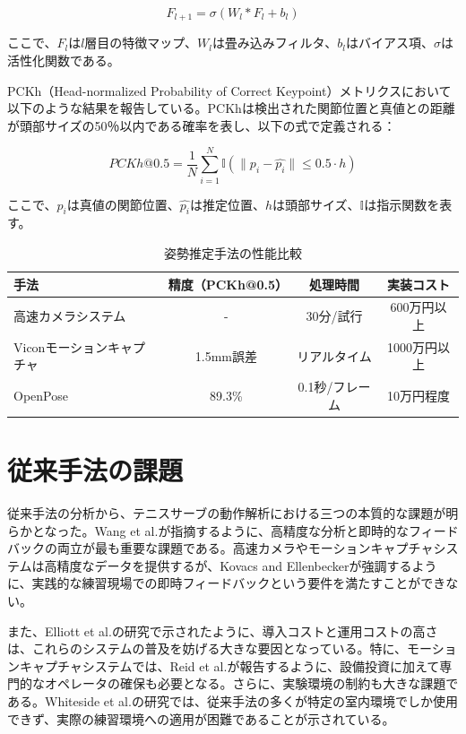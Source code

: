 \documentclass[oneside]{suribt}[11pt]
\begin{document}
\begin{equation}
F_{l+1} = \sigma(W_l * F_l + b_l)
\end{equation}

ここで、$F_l$は$l$層目の特徴マップ、$W_l$は畳み込みフィルタ、$b_l$はバイアス項、$\sigma$は活性化関数である。

PCKh（Head-normalized Probability of Correct Keypoint）メトリクスにおいて以下のような結果を報告している。PCKhは検出された関節位置と真値との距離が頭部サイズの50％以内である確率を表し、以下の式で定義される：

\begin{equation}
PCKh@0.5 = \frac{1}{N}\sum_{i=1}^{N} \mathbb{I}(\|p_i - \hat{p_i}\| \leq 0.5 \cdot h)
\end{equation}

ここで、$p_i$は真値の関節位置、$\hat{p_i}$は推定位置、$h$は頭部サイズ、$\mathbb{I}$は指示関数を表す。

\begin{table}[htbp]
\caption{姿勢推定手法の性能比較\cite{openpose,reid2007,abrams2018}}
\label{tab:comparison}
\centering
\begin{tabular}{lccc}
\hline
手法 & 精度（PCKh@0.5） & 処理時間 & 実装コスト \\
\hline
高速カメラシステム & - & 30分/試行 & 600万円以上 \\
Viconモーションキャプチャ & 1.5mm誤差 & リアルタイム & 1000万円以上 \\
OpenPose & 89.3\% & 0.1秒/フレーム & 10万円程度 \\
\hline
\end{tabular}
\end{table}

\section{従来手法の課題}
従来手法の分析から、テニスサーブの動作解析における三つの本質的な課題が明らかとなった。Wang et al.\cite{wang2019}が指摘するように、高精度な分析と即時的なフィードバックの両立が最も重要な課題である。高速カメラやモーションキャプチャシステムは高精度なデータを提供するが、Kovacs and Ellenbecker\cite{kovacs2011}が強調するように、実践的な練習現場での即時フィードバックという要件を満たすことができない。

また、Elliott et al.\cite{elliott2003}の研究で示されたように、導入コストと運用コストの高さは、これらのシステムの普及を妨げる大きな要因となっている。特に、モーションキャプチャシステムでは、Reid et al.\cite{reid2007}が報告するように、設備投資に加えて専門的なオペレータの確保も必要となる。さらに、実験環境の制約も大きな課題である。Whiteside et al.\cite{whiteside2013}の研究では、従来手法の多くが特定の室内環境でしか使用できず、実際の練習環境への適用が困難であることが示されている。
\end{document}
